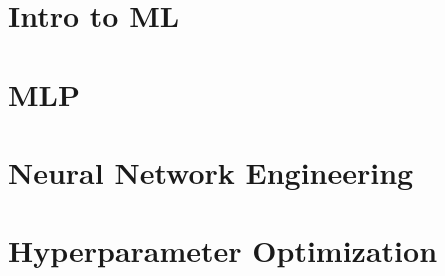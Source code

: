 \documentclass{article}
\begin{document}
\section{Intro to ML}

\newpage

\section{MLP}

\newpage

\section{Neural Network Engineering}

\newpage

\section{Hyperparameter Optimization}

\end{document}
